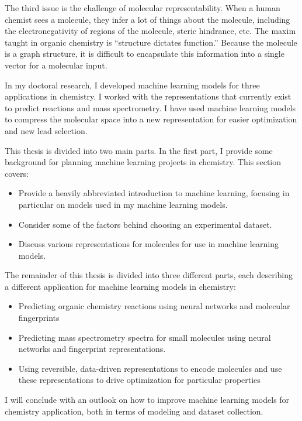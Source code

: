 The third issue is the challenge of molecular representability. When a human chemist sees a molecule, they infer a lot of things about the molecule, including the electronegativity of regions of the molecule, steric hindrance, etc. The maxim taught in organic chemistry is “structure dictates function.” Because the molecule is a graph structure, it is difficult to encapsulate this information into a single vector for a molecular input.

In my doctoral research, I developed machine learning models for three applications in chemistry. I worked with the representations that currently exist to predict reactions and mass spectrometry. I have used machine learning models to compress the molecular space into a new representation for easier optimization and new lead selection.

This thesis is divided into two main parts. In the first part, I provide some background for planning machine learning projects in chemistry. This section covers:
\begin{itemize}
\item Provide a heavily abbreviated introduction to machine learning, focusing in particular on models used in my machine learning models.
\item Consider some of the factors behind choosing an experimental dataset.
\item Discuss various representations for molecules for use in machine learning models.
\end{itemize}

The remainder of this thesis is divided into three different parts, each describing a different application for machine learning models in chemistry: 
\begin{itemize}
\item Predicting organic chemistry reactions using neural networks and molecular fingerprints
\item Predicting mass spectrometry spectra for small molecules using neural networks and fingerprint representations.
\item Using reversible, data-driven representations to encode molecules and use these representations to drive optimization for particular properties
\end{itemize}

I will conclude with an outlook on how to improve machine learning models for chemistry application, both in terms of modeling and dataset collection.

